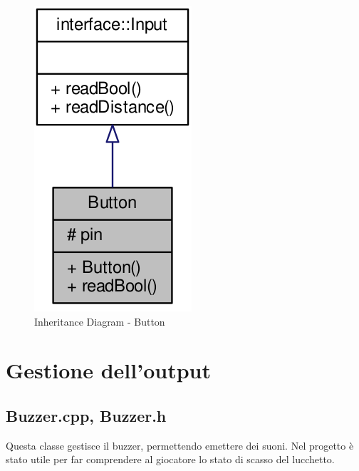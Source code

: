 \begin{figure}[!ht]
	\centering
	\includegraphics[scale=.35]{img/UML/InheritanceDiagram/Button.png}
	\caption{Inheritance Diagram - Button}
\end{figure}

\newpage
\section{Gestione dell'output}
\subsection{Buzzer.cpp, Buzzer.h}
Questa classe gestisce il buzzer, permettendo emettere dei suoni. Nel progetto è stato utile per far comprendere al giocatore lo stato di scasso del lucchetto.
